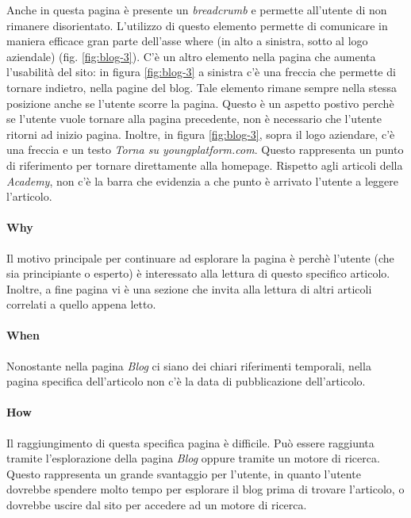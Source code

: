 Anche in questa pagina è presente un \textit{breadcrumb} e permette 
all'utente di non rimanere disorientato. L'utilizzo di questo elemento 
permette di comunicare in maniera efficace gran parte dell'asse where 
(in alto a sinistra, sotto al logo aziendale) (fig. \ref{fig:blog-3}). 
C'è un altro elemento nella pagina che aumenta l'usabilità del sito: 
in figura \ref{fig:blog-3} a sinistra c'è una freccia che permette di 
tornare indietro, nella pagine del blog. Tale elemento rimane sempre nella 
stessa posizione anche se l'utente scorre la pagina. Questo è un aspetto 
postivo perchè se l'utente vuole tornare alla pagina precedente, non è 
necessario che l'utente ritorni ad inizio pagina. Inoltre, in figura 
\ref{fig:blog-3}, sopra il logo aziendare, c'è una freccia e un testo 
\textit{Torna su youngplatform.com}. Questo rappresenta un punto di 
riferimento per tornare direttamente alla homepage. Rispetto agli articoli 
della \textit{Academy}, non c'è la barra che evidenzia a che punto è 
arrivato l'utente a leggere l'articolo.

\paragraph{Why}

Il motivo principale per continuare ad esplorare la pagina è perchè 
l'utente (che sia principiante o esperto) è interessato alla lettura di 
questo specifico articolo. Inoltre, a fine pagina vi è una sezione che 
invita alla lettura di altri articoli correlati a quello appena letto.

\paragraph{When}

Nonostante nella pagina \textit{Blog} ci siano dei chiari riferimenti 
temporali, nella pagina specifica dell'articolo non c'è la data di 
pubblicazione dell'articolo.

\paragraph{How}

Il raggiungimento di questa specifica pagina è difficile. Può essere 
raggiunta tramite l'esplorazione della pagina \textit{Blog} oppure tramite 
un motore di ricerca. Questo rappresenta un grande svantaggio per l'utente, 
in quanto l'utente dovrebbe spendere molto tempo per esplorare il blog 
prima di trovare l'articolo, o dovrebbe uscire dal sito per accedere ad 
un motore di ricerca.

